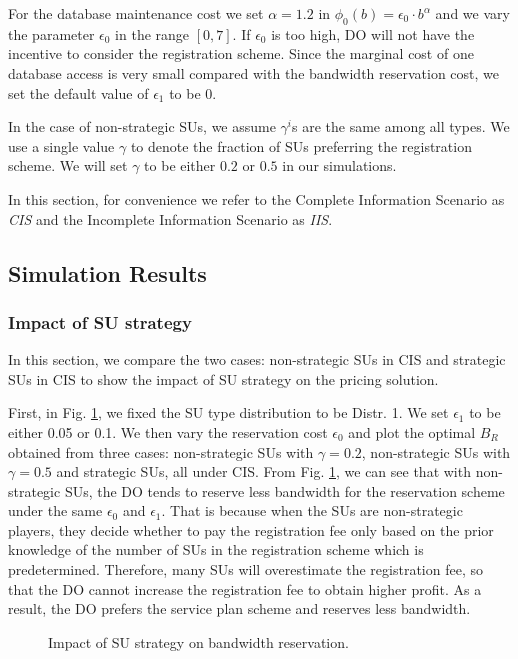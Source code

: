\documentclass[journal]{IEEEtran}
\begin{document}
For the database maintenance cost we set $\alpha=1.2$ in $\phi_0(b)=\epsilon_0\cdot b^{\alpha}$ and we vary the parameter $\epsilon_0$ in the range $[0, 7]$. If $\epsilon_0$ is too high, DO will not have the incentive to consider the registration scheme. Since the marginal cost of one database access is very small compared with the bandwidth reservation cost, we set the default value of $\epsilon_1$ to be 0.

In the case of non-strategic SUs, we assume $\gamma^i$s are the same among all types. We use a single value $\gamma$ to denote the fraction of SUs preferring the registration scheme. We will set $\gamma$ to be either $0.2$ or $0.5$ in our simulations.

In this section, for convenience we refer to the Complete Information Scenario as \emph{CIS} and the Incomplete Information Scenario as \emph{IIS}.

\subsection{Simulation Results}

\subsubsection{Impact of SU strategy}

In this section, we compare the two cases: non-strategic SUs in CIS and strategic SUs in CIS to show the impact of SU strategy on the pricing solution.

First, in Fig. \ref{fig:epsilon0-B_R_non-strategic}, we fixed the SU type distribution to be Distr. 1. We set $\epsilon_1$ to be either 0.05 or 0.1. We then vary the reservation cost $\epsilon_0$ and plot the optimal $B_R$ obtained from three cases: non-strategic SUs with $\gamma=0.2$, non-strategic SUs with $\gamma=0.5$ and strategic SUs, all under CIS. From Fig. \ref{fig:epsilon0-B_R_non-strategic}, we can see that with non-strategic SUs, the DO tends to reserve less bandwidth for the reservation scheme under the same $\epsilon_0$ and $\epsilon_1$. That is because when the SUs are non-strategic players, they decide whether to pay the registration fee only based on the prior knowledge of the number of SUs in the registration scheme which is predetermined. Therefore, many SUs will overestimate the registration fee, so that the DO cannot increase the registration fee to obtain higher profit. As a result, the DO prefers the service plan scheme and reserves less bandwidth.
\begin{figure}[t]
\centering
\subfloat[$\epsilon_1=0.05$.]
{\centering \texttt{[image: epsilon0-B\_R\_non-strategic\_ep1=005.pdf]}         \label{fig:epsilon0-B_R_non-strategic_ep1=0.05}}\subfloat[$\epsilon_1=0.1$.]
{\centering\texttt{[image: epsilon0-B\_R\_non-strategic\_ep1=01.pdf]}           \label{fig:epsilon0-B_R_non-strategic_ep1=0.1}}\caption{Impact of SU strategy on bandwidth reservation.}
\label{fig:epsilon0-B_R_non-strategic}
\vspace{-0.0cm}
\end{figure}
\end{document}
